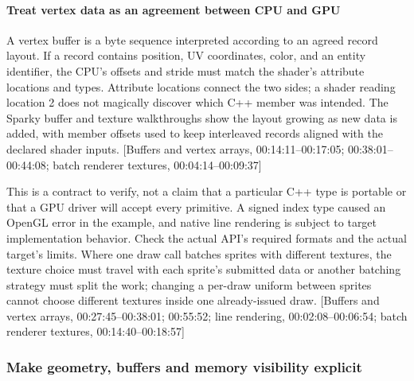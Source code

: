 \paragraph{Treat vertex data as an agreement between CPU and GPU}\label{treat-vertex-data-as-an-agreement-between-cpu-and-gpu}

A vertex buffer is a byte sequence interpreted according to an agreed record layout. If a record contains position, UV coordinates, color, and an entity identifier, the CPU's offsets and stride must match the shader's attribute locations and types. Attribute locations connect the two sides; a shader reading location 2 does not magically discover which C++ member was intended. The Sparky buffer and texture walkthroughs show the layout growing as new data is added, with member offsets used to keep interleaved records aligned with the declared shader inputs. {[}Buffers and vertex arrays, 00:14:11--00:17:05; 00:38:01--00:44:08; batch renderer textures, 00:04:14--00:09:37{]}

This is a contract to verify, not a claim that a particular C++ type is portable or that a GPU driver will accept every primitive. A signed index type caused an OpenGL error in the example, and native line rendering is subject to target implementation behavior. Check the actual API's required formats and the actual target's limits. Where one draw call batches sprites with different textures, the texture choice must travel with each sprite's submitted data or another batching strategy must split the work; changing a per-draw uniform between sprites cannot choose different textures inside one already-issued draw. {[}Buffers and vertex arrays, 00:27:45--00:38:01; 00:55:52; line rendering, 00:02:08--00:06:54; batch renderer textures, 00:14:40--00:18:57{]}

\subsubsection{Make geometry, buffers and memory visibility explicit}\label{make-geometry-buffers-and-memory-visibility-explicit}

